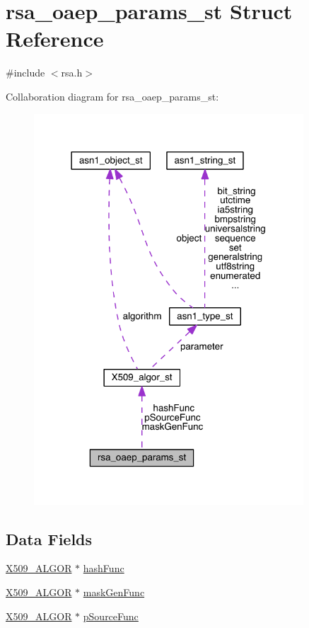 \hypertarget{structrsa__oaep__params__st}{}\section{rsa\+\_\+oaep\+\_\+params\+\_\+st Struct Reference}
\label{structrsa__oaep__params__st}


{\ttfamily \#include $<$rsa.\+h$>$}



Collaboration diagram for rsa\+\_\+oaep\+\_\+params\+\_\+st\+:\nopagebreak
\begin{figure}[H]
\begin{center}
\leavevmode
\includegraphics[width=286pt]{structrsa__oaep__params__st__coll__graph}
\end{center}
\end{figure}
\subsection*{Data Fields}
\begin{DoxyCompactItemize}
\item 
\hyperlink{crypto_2ossl__typ_8h_aa2b6185e6254f36f709cd6577fb5022e}{X509\+\_\+\+A\+L\+G\+OR} $\ast$ \hyperlink{structrsa__oaep__params__st_a1d5ffe64f97e9afa3614ee02a7f8ad0d}{hash\+Func}
\item 
\hyperlink{crypto_2ossl__typ_8h_aa2b6185e6254f36f709cd6577fb5022e}{X509\+\_\+\+A\+L\+G\+OR} $\ast$ \hyperlink{structrsa__oaep__params__st_a55fde057dfe03c786944ac4f224138d1}{mask\+Gen\+Func}
\item 
\hyperlink{crypto_2ossl__typ_8h_aa2b6185e6254f36f709cd6577fb5022e}{X509\+\_\+\+A\+L\+G\+OR} $\ast$ \hyperlink{structrsa__oaep__params__st_ad1e67fbea62b4092c06271ea0dc989ad}{p\+Source\+Func}
\end{DoxyCompactItemize}


